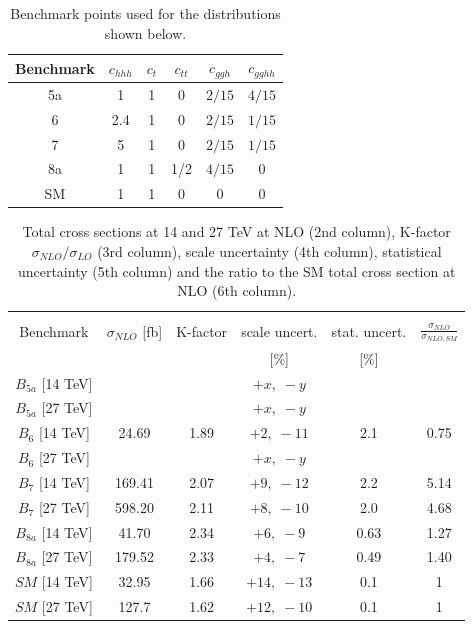 \begin{table}[htb]
\begin{center}
\begin{tabular}{| c | c  c  c  c  c |}
\hline
Benchmark & $c_{hhh}$ & $c_t$ & $c_{tt}$ & $c_{ggh}$ & $c_{gghh}$ \\
\hline
5a & 1 & 1 & 0 &   $2/15$ & $4/15$\\
\hline
6 & 2.4 & 1 & 0 & $2/15$ & $1/15$  \\
\hline
7 & 5 & 1 & 0 & $2/15$ & $1/15$  \\
\hline
8a & 1 & 1 & 1/2 & $4/15$ & 0\\
\hline
SM & 1 & 1 & 0 & 0 & 0 \\
\hline
\end{tabular}
\end{center}
\caption{Benchmark points used for the distributions shown below.\label{tab:benchmarks}}
\end{table}
%
\begin{table}[htb]
\begin{center}
\begin{tabular}{|c|c|c|c|c|c|}
\hline
&&&&&\\
Benchmark & $\sigma_{NLO}$ [fb] & K-factor & scale uncert.  &
stat. uncert.   &$\frac{\sigma_{NLO}}{\sigma_{NLO,SM}}$ \\ 
&&&[\%] &[\%] &\\
\hline
$    B_{5a}$ [14 TeV] &  & & ${+x, \; -y}$ &  &  \\ 
$    B_{5a}$ [27 TeV] &  &  & ${+x, \; -y}$ &  &   \\ 
\hline
$    B_{6}$ [14 TeV] &  24.69 & 1.89 & ${+2, \; -11}$ & 2.1 & 0.75 \\ 
$    B_{6}$ [27 TeV] &  &  & ${+x, \; -y}$ &  &   \\ 
\hline
$   B_7$ [14 TeV] & 169.41 & 2.07& ${+9, \; -12}$ & 2.2 & 5.14 \\
$   B_7$ [27 TeV] & 598.20 & 2.11 & ${+8, \; -10}$ & 2.0 &  4.68\\
\hline 
$   B_{8a}$ [14 TeV] & 41.70 & 2.34& ${+6, \; -9}$ & 0.63 & 1.27 \\
$   B_{8a}$ [27 TeV] & 179.52 & 2.33 & ${+4, \; -7}$ & 0.49 & 1.40 \\
\hline 
$   SM $ [14 TeV] & 32.95 & 1.66 & ${+14, \; -13}$ & 0.1 & 1\\
$   SM $ [27 TeV] & 127.7&  1.62 & ${+12, \; -10}$ & 0.1 & 1\\
\hline
\end{tabular}
\end{center}
\caption{Total cross sections at 14 and 27 TeV at NLO (2nd column),
K-factor $\sigma_{NLO}/\sigma_{LO}$ (3rd column),
scale uncertainty (4th column), statistical uncertainty (5th column)
and the ratio to the SM total cross section at NLO (6th column).\label{sigmatot}}
\end{table}

